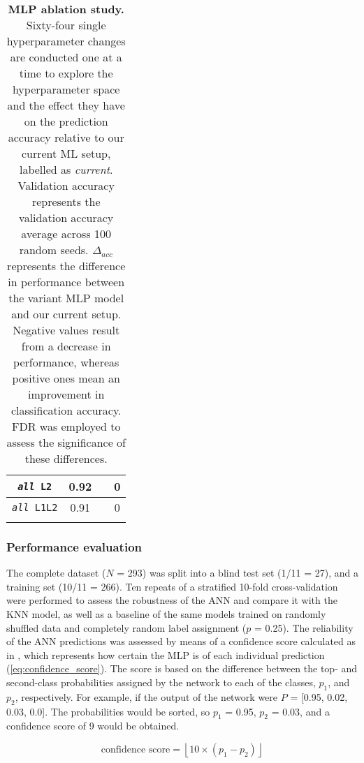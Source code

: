 \begin{longtable}{|c|c|c|c|}
\texttt{\textit{all} L2}            & 0.92              &  \textminus1.70                    & 0            \\ \hline
\texttt{\textit{all} L1L2}          & 0.91              &  \textminus2.56                   & 0            \\ \hline
\caption[MLP ablation study]{\textbf{MLP ablation study.} Sixty-four single hyperparameter changes are conducted one at a time to explore the hyperparameter space and the effect they have on the prediction accuracy relative to our current ML setup, labelled as \textit{current}. Validation accuracy represents the validation accuracy average across 100 random seeds. $\Delta_{acc}$ represents the difference in performance between the variant MLP model and our current setup. Negative values result from a decrease in performance, whereas positive ones mean an improvement in classification accuracy. FDR was employed to assess the significance of these differences.}
\label{tab:MLP_ablation}\\
\end{longtable}

\subsubsection{Performance evaluation}

The complete dataset ($N$ = 293) was split into a blind test set (1/11 = 27), and a training set (10/11 = 266). Ten repeats of a stratified 10-fold cross-validation were performed to assess the robustness of the ANN and compare it with the KNN model, as well as a baseline of the same models trained on randomly shuffled data and completely random label assignment ($p$ = 0.25). The reliability of the ANN predictions was assessed by means of a confidence score calculated as in \cite{CUFF_2000_PROFILES}, which represents how certain the MLP is of each individual prediction (\autoref{eq:confidence_score}). The score is based on the difference between the top- and second-class probabilities assigned by the network to each of the classes, $p_{1}$, and $p_{2}$, respectively. For example, if the output of the network were $P$ = [0.95, 0.02, 0.03, 0.0]. The probabilities would be sorted, so $p_{1}$ = 0.95, $p_{2}$ = 0.03, and a confidence score of 9 would be obtained.

\begin{equation}
\text{confidence score} = \left\lfloor 10 \times (p_1 - p_2) \right\rfloor
\label{eq:confidence_score}
\end{equation}

